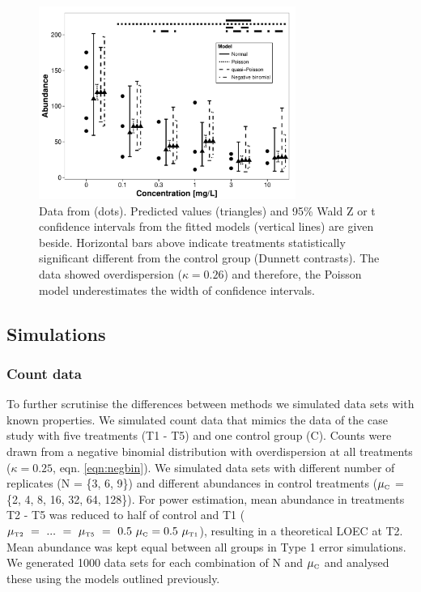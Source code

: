 \documentclass[twocolumn, natbib]{svjour3}
\begin{document}
\begin{figure}[h]
  \centering
  \includegraphics[width = 84mm]{example.pdf}
  \caption{Data from \citet{brock_minimum_2015} (dots). 
  Predicted values (triangles) and 95\% Wald Z or t confidence intervals from the fitted models (vertical lines) are given beside.
  Horizontal bars above indicate treatments statistically significant different from the control group (Dunnett contrasts).
  The data showed overdispersion ($\kappa = 0.26$) and therefore, the Poisson model underestimates the width of confidence intervals.
  }
  \label{fig:example}
\end{figure}


\subsection{Simulations}
\subsubsection{Count data}
To further scrutinise the differences between methods we simulated data sets with known properties.
We simulated count data that mimics the data of the case study with five treatments (T1 - T5) and one control group (C).
Counts were drawn from a negative binomial distribution with overdispersion at all treatments ($\kappa = 0.25$, eqn. \ref{eqn:negbin}).
We simulated data sets with different number of replicates (N = \{3, 6, 9\}) and different abundances in control treatments ($\mu_\text{\tiny C}$ = \{2, 4, 8, 16, 32, 64, 128\}). 
For power estimation, mean abundance in treatments T2 - T5 was reduced to half of control and T1 ($\mu_\text{\tiny T2}~=~...~=~\mu_\text{\tiny T5}~=~0.5~\mu_\text{\tiny C} = 0.5~\mu_\text{\tiny T1}$), resulting in a theoretical LOEC at T2.
Mean abundance was kept equal between all groups in Type 1 error simulations.
We generated 1000 data sets for each combination of N and $\mu_\text{\tiny C}$ and analysed these using the models outlined previously.
\end{document}
